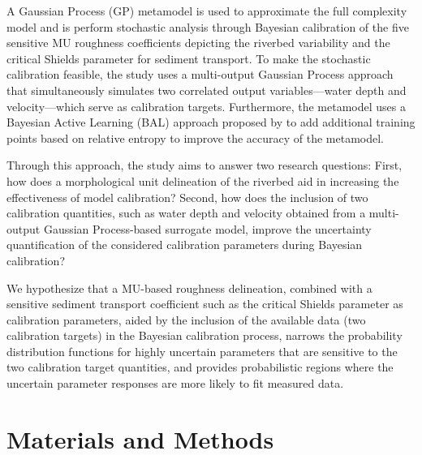 \documentclass[draft,linenumbers,onecolumn]{agujournal2019} %
\begin{document}
A Gaussian Process (GP) metamodel is used to approximate the full complexity model and is perform stochastic analysis through Bayesian calibration of the five sensitive MU roughness coefficients depicting the riverbed variability and the critical Shields parameter for sediment transport. To make the stochastic calibration feasible, the study uses a multi-output Gaussian Process approach that simultaneously simulates two correlated output variables—water depth and velocity—which serve as calibration targets. Furthermore, the metamodel uses a Bayesian Active Learning (BAL) approach proposed by  to add additional training points based on relative entropy to improve the accuracy of the metamodel. 

Through this approach, the study aims to answer two research questions: First, how does a morphological unit delineation of the riverbed aid in increasing the effectiveness of model calibration? Second, how does the inclusion of two calibration quantities, such as water depth and velocity obtained from a multi-output Gaussian Process-based surrogate model, improve the uncertainty quantification of the considered calibration parameters during Bayesian calibration?

We hypothesize that a MU-based roughness delineation, combined with a sensitive sediment transport coefficient such as the critical Shields parameter as calibration parameters, aided by the inclusion of the available data (two calibration targets) in the Bayesian calibration process, narrows the probability distribution functions for highly uncertain parameters that are sensitive to the two calibration target quantities, and provides probabilistic regions where the uncertain parameter responses are more likely to fit measured data.  


\section{Materials and Methods} 
\label{Materials}
\end{document}

